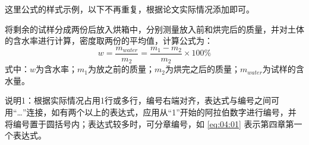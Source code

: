 这里公式的样式示例，以下不再重复，根据论文实际情况添加即可。

将剩余的试样分成两份后放入烘箱中，分别测量放入前和烘完后的质量，并对土体的含水率进行计算，密度取两份的平均值，计算公式为：
\begin{equation}
\label{eq:04:01}
    w = \frac{m_{water}}{m_2} = \frac{m_1-m_2}{m_2}\times 100\%
\end{equation}
式中：$w$为含水率；$m_1$为放之前的质量；$m_2$为烘完之后的质量；$m_{water}$为试样的含水量。

说明1：根据实际情况占用1行或多行，编号右端对齐，表达式与编号之间可用“…”连接，如有两个以上的表达式，应用从“1”开始的阿拉伯数字进行编号，并将编号置于圆括号内；表达式较多时，可分章编号，如 \eqref{eq:04:01} 表示第四章第一个表达式。

